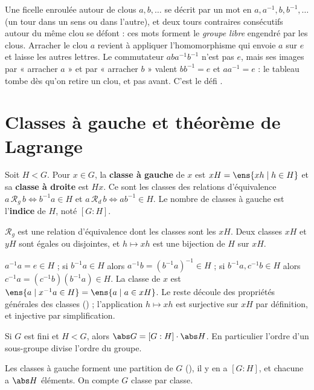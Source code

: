 \begin{remarque}
Une ficelle enroulée autour de clous $a,b,\dots$ se décrit par un mot en $a,a^{-1},b,b^{-1},\dots$ (un tour dans un sens ou dans l'autre), et deux tours contraires consécutifs autour du même clou se défont : ces mots forment le \emph{groupe libre} engendré par les clous. Arracher le clou $a$ revient à appliquer l'homomorphisme qui envoie $a$ sur $e$ et laisse les autres lettres. Le commutateur $aba^{-1}b^{-1}$ n'est pas $e$, mais ses images par « arracher $a$ » et par « arracher $b$ » valent $bb^{-1}=e$ et $aa^{-1}=e$ : le tableau tombe dès qu'on retire un clou, et pas avant. C'est le défi .
\end{remarque}

\section{Classes à gauche et théorème de Lagrange}
\begin{definition}[Classes]
Soit $H<G$. Pour $x\in G$, la \textbf{classe à gauche} de $x$ est $xH=\ens{xh\mid h\in H}$ et sa \textbf{classe à droite} est $Hx$. Ce sont les classes des relations d'équivalence $a\,\mathcal R_g\,b\iff b^{-1}a\in H$ et $a\,\mathcal R_d\,b\iff ab^{-1}\in H$. Le nombre de classes à gauche est l'\textbf{indice} de $H$, noté $[G:H]$.
\end{definition}
\begin{lemme}\label{lem-classes}
$\mathcal R_g$ est une relation d'équivalence dont les classes sont les $xH$. Deux classes $xH$ et $yH$ sont égales ou disjointes, et $h\mapsto xh$ est une bijection de $H$ sur $xH$.
\end{lemme}
\begin{preuve}
$a^{-1}a=e\in H$ ; si $b^{-1}a\in H$ alors $a^{-1}b=(b^{-1}a)^{-1}\in H$ ; si $b^{-1}a,c^{-1}b\in H$ alors $c^{-1}a=(c^{-1}b)(b^{-1}a)\in H$. La classe de $x$ est $\ens{a\mid x^{-1}a\in H}=\ens{a\mid a\in xH}$. Le reste découle des propriétés générales des classes () ; l'application $h\mapsto xh$ est surjective sur $xH$ par définition, et injective par simplification.
\end{preuve}
\begin{theoreme}[Lagrange]\label{thm-lagrange}
Si $G$ est fini et $H<G$, alors $\abs G=[G:H]\cdot\abs H$. En particulier l'ordre d'un sous-groupe divise l'ordre du groupe.
\end{theoreme}
\begin{preuve}
Les classes à gauche forment une partition de $G$ (), il y en a $[G:H]$, et chacune a $\abs H$ éléments. On compte $G$ classe par classe.
\end{preuve}
